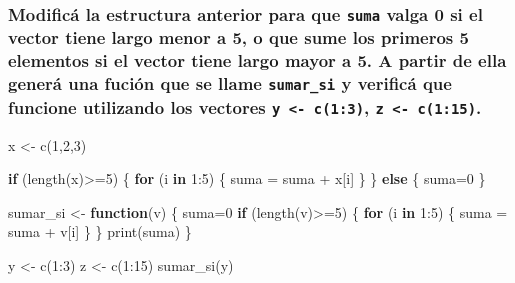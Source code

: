 \documentclass[
]{article}
\newenvironment{Shaded}{\begin{snugshade}}{\end{snugshade}}
\newcommand{\ControlFlowTok}[1]{\textcolor[rgb]{0.13,0.29,0.53}{\textbf{#1}}}
\newcommand{\DecValTok}[1]{\textcolor[rgb]{0.00,0.00,0.81}{#1}}
\newcommand{\FunctionTok}[1]{\textcolor[rgb]{0.00,0.00,0.00}{#1}}
\newcommand{\NormalTok}[1]{#1}
\newcommand{\OtherTok}[1]{\textcolor[rgb]{0.56,0.35,0.01}{#1}}
\newcommand{\SpecialCharTok}[1]{\textcolor[rgb]{0.00,0.00,0.00}{#1}}
\begin{document}
\hypertarget{modificuxe1-la-estructura-anterior-para-que-suma-valga-0-si-el-vector-tiene-largo-menor-a-5-o-que-sume-los-primeros-5-elementos-si-el-vector-tiene-largo-mayor-a-5.-a-partir-de-ella-generuxe1-una-fuciuxf3n-que-se-llame-sumar_si-y-verificuxe1-que-funcione-utilizando-los-vectores-y---c13-z---c115.}{%
\subsubsection{\texorpdfstring{Modificá la estructura anterior para que
\texttt{suma} valga 0 si el vector tiene largo menor a 5, o que sume los
primeros 5 elementos si el vector tiene largo mayor a 5. A partir de
ella generá una fución que se llame \texttt{sumar\_si} y verificá que
funcione utilizando los vectores \texttt{y\ \textless{}-\ c(1:3)},
\texttt{z\ \textless{}-\ c(1:15)}.}{Modificá la estructura anterior para que suma valga 0 si el vector tiene largo menor a 5, o que sume los primeros 5 elementos si el vector tiene largo mayor a 5. A partir de ella generá una fución que se llame sumar\_si y verificá que funcione utilizando los vectores y \textless- c(1:3), z \textless- c(1:15).}}\label{modificuxe1-la-estructura-anterior-para-que-suma-valga-0-si-el-vector-tiene-largo-menor-a-5-o-que-sume-los-primeros-5-elementos-si-el-vector-tiene-largo-mayor-a-5.-a-partir-de-ella-generuxe1-una-fuciuxf3n-que-se-llame-sumar_si-y-verificuxe1-que-funcione-utilizando-los-vectores-y---c13-z---c115.}}

\begin{Shaded}
\begin{Highlighting}[]
\NormalTok{x }\OtherTok{\textless{}{-}} \FunctionTok{c}\NormalTok{(}\DecValTok{1}\NormalTok{,}\DecValTok{2}\NormalTok{,}\DecValTok{3}\NormalTok{)}

\ControlFlowTok{if}\NormalTok{ (}\FunctionTok{length}\NormalTok{(x)}\SpecialCharTok{\textgreater{}=}\DecValTok{5}\NormalTok{) \{ }
  \ControlFlowTok{for}\NormalTok{ (i }\ControlFlowTok{in} \DecValTok{1}\SpecialCharTok{:}\DecValTok{5}\NormalTok{) \{ }
\NormalTok{      suma }\OtherTok{=}\NormalTok{ suma }\SpecialCharTok{+}\NormalTok{ x[i]}
\NormalTok{      \}}
\NormalTok{\} }\ControlFlowTok{else}\NormalTok{ \{}
\NormalTok{  suma}\OtherTok{=}\DecValTok{0}
\NormalTok{\}}

\NormalTok{sumar\_si }\OtherTok{\textless{}{-}} \ControlFlowTok{function}\NormalTok{(v) \{}
\NormalTok{  suma}\OtherTok{=}\DecValTok{0}
  \ControlFlowTok{if}\NormalTok{ (}\FunctionTok{length}\NormalTok{(v)}\SpecialCharTok{\textgreater{}=}\DecValTok{5}\NormalTok{) \{ }
    \ControlFlowTok{for}\NormalTok{ (i }\ControlFlowTok{in} \DecValTok{1}\SpecialCharTok{:}\DecValTok{5}\NormalTok{) \{ }
\NormalTok{      suma }\OtherTok{=}\NormalTok{ suma }\SpecialCharTok{+}\NormalTok{ v[i]}
\NormalTok{      \}}
\NormalTok{  \}}
  \FunctionTok{print}\NormalTok{(suma)}
\NormalTok{\}}

\NormalTok{y }\OtherTok{\textless{}{-}} \FunctionTok{c}\NormalTok{(}\DecValTok{1}\SpecialCharTok{:}\DecValTok{3}\NormalTok{)}
\NormalTok{z }\OtherTok{\textless{}{-}} \FunctionTok{c}\NormalTok{(}\DecValTok{1}\SpecialCharTok{:}\DecValTok{15}\NormalTok{)}
\FunctionTok{sumar\_si}\NormalTok{(y)}
\end{Highlighting}
\end{Shaded}
\end{document}
